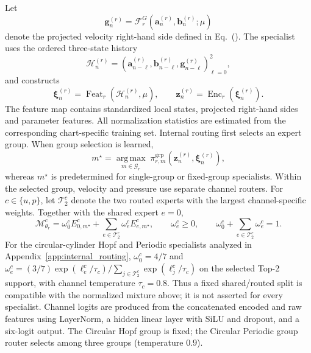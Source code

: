 Let
\begin{equation}
  \bm g_n^{(r)}
  =
  \mathcal F_r^G
  \left(
    \bm a_n^{(r)},\bm b_n^{(r)};\mu
  \right)
  \label{eq:app_galerkin_feature}
\end{equation}
denote the projected velocity right-hand side defined in Eq.~(). The specialist uses the ordered three-state history
\begin{equation}
  \mathcal H_n^{(r)}
  =
  \left(
    \bm a_{n-\ell}^{(r)},
    \bm b_{n-\ell}^{(r)},
    \bm g_{n-\ell}^{(r)}
  \right)_{\ell=0}^{2},
  \label{eq:app_specialist_history}
\end{equation}
and constructs
\begin{equation}
  \bm\xi_n^{(r)}
  =
  \operatorname{Feat}_r
  \left(
    \mathcal H_n^{(r)},\mu
  \right),
  \qquad
  \bm z_n^{(r)}
  =
  \operatorname{Enc}_r
  \left(
    \bm\xi_n^{(r)}
  \right).
  \label{eq:app_specialist_features}
\end{equation}
The feature map contains standardized local states, projected
right-hand sides and parameter features. All normalization statistics are estimated from the corresponding chart-specific training set. Internal routing first selects an expert group. When group selection is learned,
\begin{equation}
  m^\star
  =
  \underset{m\in\mathcal G_r}{\operatorname{arg\,max}}
  \;
  \pi_{r,m}^{\mathrm{grp}}
  \left(
    \bm z_n^{(r)},\bm\xi_n^{(r)}
  \right),
  \label{eq:app_group_top1}
\end{equation}
whereas $m^\star$ is predetermined for single-group or fixed-group
specialists. Within the selected group, velocity and pressure use separate channel routers. For $c\in\{u,p\}$, let $\mathcal T_2^c$ denote the two routed experts with the largest channel-specific weights. Together with the shared expert $e=0$,
\begin{equation}
  \mathcal M_{\theta_r}^c
  =
  \omega_0^c
  E_{0,m^\star}^c
  +
  \sum_{e\in\mathcal T_2^c}
  \omega_e^c
  E_{e,m^\star}^c,
  \qquad
  \omega_e^c\ge0,
  \qquad
  \omega_0^c+\sum_{e\in\mathcal T_2^c}\omega_e^c=1.
  \label{eq:app_channel_sparse_moe}
\end{equation}
For the circular-cylinder Hopf and Periodic specialists analyzed in Appendix~\ref{app:internal_routing}, $\omega_0^c=4/7$ and $\omega_e^c=(3/7)\exp(\ell_e^c/\tau_c)/\sum_{j\in\mathcal T_2^c}\exp(\ell_j^c/\tau_c)$ on the selected Top-2 support, with channel temperature $\tau_c=0.8$. Thus a fixed shared/routed split is compatible with the normalized mixture above; it is not asserted for every specialist. Channel logits are produced from the concatenated encoded and raw features using LayerNorm, a hidden linear layer with SiLU and dropout, and a six-logit output. The Circular Hopf group is fixed; the Circular Periodic group router selects among three groups (temperature $0.9$).

